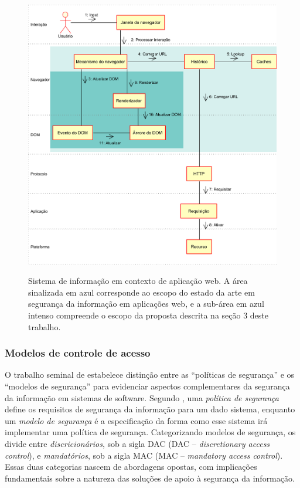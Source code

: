\begin{figure}[h]
	\centering
	\includegraphics[width=12cm]{diagramas/escopo.png}
	\label{Fig: diagrama04}
	\caption[Sistema de informação em contexto de aplicação web]
	{Sistema de informação em contexto de aplicação web. A área sinalizada em azul corresponde ao escopo do estado da arte em segurança da informação em aplicações web, e a sub-área em azul intenso compreende o escopo da proposta descrita na seção 3 deste trabalho.}
\end{figure}


\subsubsection{Modelos de controle de acesso}
O trabalho seminal de  estabelece distinção entre as ``políticas de segurança'' e os ``modelos de segurança'' para evidenciar aspectos complementares da segurança da informação em sistemas de software. Segundo \citeauthor{Goguen1982}, uma \textit{política de segurança} define os requisitos de segurança da informação para um dado sistema, enquanto um \textit{modelo de segurança} é a especificação da forma como esse sistema irá implementar uma política de segurança. Categorizando modelos de segurança,  os divide entre \textit{discricionários}, sob a sigla DAC (DAC -- \textit{discretionary access control}), e \textit{mandatórios}, sob a sigla MAC (MAC -- \textit{mandatory access control}). Essas duas categorias nascem de abordagens opostas, com implicações fundamentais sobre a natureza das soluções de apoio à segurança da informação.


